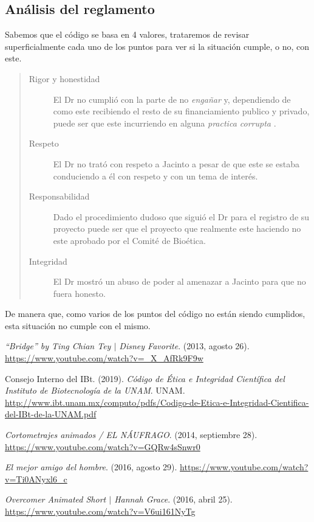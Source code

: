 \documentclass[12pt]{article}
\begin{document}
\subsection{Análisis del reglamento}

	\par Sabemos que el código \cite{codigo unam} se basa en 4 valores, trataremos de revisar superficialmente cada uno de los puntos para ver si la situación cumple, o no, con este.
	\begin{quote}
		\begin{description}
			\item [Rigor y honestidad] El Dr no cumplió con la parte de no \textit{ engañar } y, dependiendo de como este recibiendo el resto de su financiamiento publico y privado, puede ser que este incurriendo en alguna \textit{ practica corrupta }.

			\item [Respeto] El Dr no trató con respeto a Jacinto a pesar de que este se estaba conduciendo a él con respeto y con un tema de interés.

			\item [Responsabilidad] Dado el procedimiento dudoso que siguió el Dr para el registro de su proyecto puede ser que el proyecto que realmente este haciendo no este aprobado por el Comité de Bioética.

			\item [Integridad] El Dr mostró un abuso de poder al amenazar a Jacinto para que no fuera honesto.
			
		\end{description}
	\end{quote}

	\par De manera que, como varios de los puntos del código no están siendo cumplidos, esta situación no cumple con el mismo.




\begin{thebibliography}{X}
	 \textit{“Bridge” by Ting Chian Tey $|$ Disney Favorite}. (2013, agosto 26). \url{https://www.youtube.com/watch?v=_X_AfRk9F9w}

	 Consejo Interno del IBt. (2019). \textit{ Código de Ética e Integridad Científica del Instituto de Biotecnología de la UNAM}. UNAM. \url{http://www.ibt.unam.mx/computo/pdfs/Codigo-de-Etica-e-Integridad-Cientifica-del-IBt-de-la-UNAM.pdf}
	
	 \textit{Cortometrajes animados / EL NÁUFRAGO}. (2014, septiembre 28). \url{ https://www.youtube.com/watch?v=GQRw4sSnwr0}

	 \textit{El mejor amigo del hombre}. (2016, agosto 29). \url{https://www.youtube.com/watch?v=Ti0ANyxl6_c}

	 \textit{Overcomer Animated Short $|$ Hannah Grace}. (2016, abril 25). \url{https://www.youtube.com/watch?v=V6ui161NyTg}

\end{thebibliography}
\end{document}
